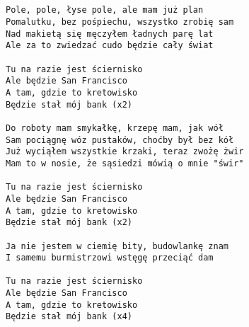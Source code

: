\documentclass[12pt]{article}
\begin{document}
\subsection*{}
\begin{verbatim}
Pole, pole, łyse pole, ale mam już plan
Pomalutku, bez pośpiechu, wszystko zrobię sam
Nad makietą się męczyłem ładnych parę lat
Ale za to zwiedzać cudo będzie cały świat

Tu na razie jest ściernisko
Ale będzie San Francisco
A tam, gdzie to kretowisko
Będzie stał mój bank (x2)

Do roboty mam smykałkę, krzepę mam, jak wół
Sam pociągnę wóz pustaków, choćby był bez kół
Już wyciąłem wszystkie krzaki, teraz zwożę żwir
Mam to w nosie, że sąsiedzi mówią o mnie "świr"

Tu na razie jest ściernisko
Ale będzie San Francisco
A tam, gdzie to kretowisko
Będzie stał mój bank (x2)

Ja nie jestem w ciemię bity, budowlankę znam
I samemu burmistrzowi wstęgę przeciąć dam

Tu na razie jest ściernisko
Ale będzie San Francisco
A tam, gdzie to kretowisko
Będzie stał mój bank (x4)
\end{verbatim}
\clearpage

\end{document}
